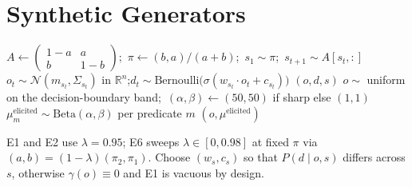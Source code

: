\documentclass[11pt,a4paper]{article}
\numberwithin{equation}{section}
\theoremstyle{plain}
\theoremstyle{definition}
\theoremstyle{remark}
\newcommand{\R}{\mathbb{R}}
\begin{document}
\section{Synthetic Generators}\label{app:gen}
\begin{algorithmic}[1]
  \State $A\gets\begin{pmatrix}1-a&a\\b&1-b\end{pmatrix}$;\ $\pi\gets(b,a)/(a+b)$;\ $s_1\sim\pi$;\ $s_{t+1}\sim A[s_t,:]$
  \State $o_t\sim\mathcal N(m_{s_t},\Sigma_{s_t})$ in $\R^n$;\quad $d_t\sim\mathrm{Bernoulli}\bigl(\sigma(w_{s_t}\cdot o_t+c_{s_t})\bigr)$ 
  \State \Return $(o,d,s)$
\EndFunction
{}
  \State $o\sim$ uniform on the decision-boundary band;\ $(\alpha,\beta)\gets(50,50)$ if sharp else $(1,1)$
  \State $\mu^{\mathrm{elicited}}_m\sim\mathrm{Beta}(\alpha,\beta)$ per predicate $m$
  \State \Return $(o,\mu^{\mathrm{elicited}})$
\EndFunction
\end{algorithmic}
E1 and E2 use $\lambda=0.95$; E6 sweeps $\lambda\in[0,0.98]$ at fixed $\pi$ via $(a,b)=(1-\lambda)(\pi_2,\pi_1)$. Choose $(w_s,c_s)$ so that $P(d\mid o,s)$ differs across $s$, otherwise $\gamma(o)\equiv0$ and E1 is vacuous by design.
\end{document}
